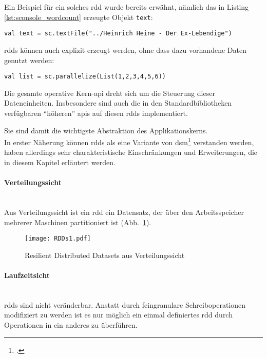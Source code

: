 Ein Beispiel für ein solches \gls{rdd} wurde bereits erwähnt, nämlich das in Listing \ref{lst:sconsole_wordcount} erzeugte Objekt \lstinline|text|:\\

\begin{lstlisting}
val text = sc.textFile("../Heinrich Heine - Der Ex-Lebendige")
\end{lstlisting}

\Glspl{rdd} können auch explizit erzeugt werden, ohne dass dazu vorhandene Daten genutzt werden:\\

\begin{lstlisting}
val list = sc.parallelize(List(1,2,3,4,5,6))
\end{lstlisting}

Die gesamte operative Kern-\gls{api} dreht sich um die Steuerung dieser Dateneinheiten. Insbesondere sind auch die in den Standardbibliotheken verfügbaren "`höheren"' \glspl{api} auf diesen \glspl{rdd} implementiert.

Sie sind damit die wichtigste Abstraktion des Applikationskerns.\\

In erster Näherung können \glspl{rdd} als eine Variante von \gls{dsm}\footcite{Nitzberg:1991:DSM:112827.112855} \cite{Mat12} verstanden werden, haben allerdings sehr charakteristische Einschränkungen und Erweiterungen, die in diesem Kapitel erläutert werden.\\

\paragraph{Verteilungssicht}\\

Aus Verteilungssicht ist ein \gls{rdd} ein Datensatz, der über den Arbeitsspeicher mehrerer Maschinen partitioniert ist (Abb.~\ref{fig:rdds1}).

\begin{figure}[ht!]
	\centering
  \texttt{[image: RDDs1.pdf]}
	\caption{Resilient Distributed Datasets aus Verteilungssicht}
	\label{fig:rdds1}
\end{figure}

\paragraph{Laufzeitsicht}\\

\Glspl{rdd} sind nicht veränderbar. Anstatt durch feingranulare Schreiboperationen modifiziert zu werden ist es nur möglich ein einmal definiertes \gls{rdd} durch Operationen in ein anderes zu überführen.\\

